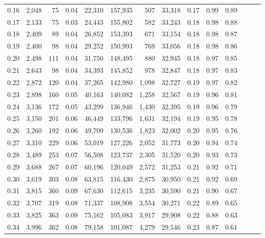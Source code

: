 \begin{tabular}{rrrrrrrrrrrrrr}
0.16 &  2,048 &   75 &  0.04 &   22,310 &  157,935 &     507 &  33,318 &  0.17 &  0.99 &      0.89 \\
0.17 &  2,133 &   75 &  0.03 &   24,443 &  155,802 &     582 &  33,243 &  0.18 &  0.98 &      0.88 \\
0.18 &  2,409 &   89 &  0.04 &   26,852 &  153,393 &     671 &  33,154 &  0.18 &  0.98 &      0.87 \\
0.19 &  2,400 &   98 &  0.04 &   29,252 &  150,993 &     769 &  33,056 &  0.18 &  0.98 &      0.86 \\
0.20 &  2,498 &  111 &  0.04 &   31,750 &  148,495 &     880 &  32,945 &  0.18 &  0.97 &      0.85 \\
0.21 &  2,643 &   98 &  0.04 &   34,393 &  145,852 &     978 &  32,847 &  0.18 &  0.97 &      0.83 \\
0.22 &  2,872 &  120 &  0.04 &   37,265 &  142,980 &   1,098 &  32,727 &  0.19 &  0.97 &      0.82 \\
0.23 &  2,898 &  160 &  0.05 &   40,163 &  140,082 &   1,258 &  32,567 &  0.19 &  0.96 &      0.81 \\
0.24 &  3,136 &  172 &  0.05 &   43,299 &  136,946 &   1,430 &  32,395 &  0.19 &  0.96 &      0.79 \\
0.25 &  3,150 &  201 &  0.06 &   46,449 &  133,796 &   1,631 &  32,194 &  0.19 &  0.95 &      0.78 \\
0.26 &  3,260 &  192 &  0.06 &   49,709 &  130,536 &   1,823 &  32,002 &  0.20 &  0.95 &      0.76 \\
0.27 &  3,310 &  229 &  0.06 &   53,019 &  127,226 &   2,052 &  31,773 &  0.20 &  0.94 &      0.74 \\
0.28 &  3,489 &  253 &  0.07 &   56,508 &  123,737 &   2,305 &  31,520 &  0.20 &  0.93 &      0.73 \\
0.29 &  3,688 &  267 &  0.07 &   60,196 &  120,049 &   2,572 &  31,253 &  0.21 &  0.92 &      0.71 \\
0.30 &  3,619 &  303 &  0.08 &   63,815 &  116,430 &   2,875 &  30,950 &  0.21 &  0.92 &      0.69 \\
0.31 &  3,815 &  360 &  0.09 &   67,630 &  112,615 &   3,235 &  30,590 &  0.21 &  0.90 &      0.67 \\
0.32 &  3,707 &  319 &  0.08 &   71,337 &  108,908 &   3,554 &  30,271 &  0.22 &  0.89 &      0.65 \\
0.33 &  3,825 &  363 &  0.09 &   75,162 &  105,083 &   3,917 &  29,908 &  0.22 &  0.88 &      0.63 \\
0.34 &  3,996 &  362 &  0.08 &   79,158 &  101,087 &   4,279 &  29,546 &  0.23 &  0.87 &      0.61 \\

\end{tabular}
